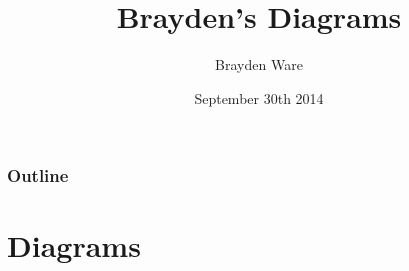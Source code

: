 \documentclass[t]{beamer}
\title{Brayden's Diagrams}
\author{Brayden Ware}
\date{September 30th 2014}
\begin{document}
\frame{\titlepage}



% 

\section*{}

\begin{frame}
  \frametitle{Outline}
  \vskip-1.5cm
  \tableofcontents
\end{frame}

\AtBeginSection[]
{
\frame{
  \vspace{2cm}
  {\huge \insertsection}
  }
}


\section{Diagrams}
\begin{frame}
\scalebox{1}{
}
\end{frame}

\begin{frame}
\scalebox{1}{
}
\end{frame}

\begin{frame}
\scalebox{0.5}{
}
\end{frame}

\begin{frame}
\scalebox{1}{
}
\end{frame}

\begin{frame}
\scalebox{1}{
}
\end{frame}
\end{document}
